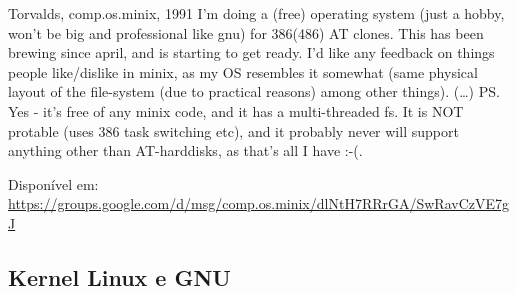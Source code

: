 \documentclass{beamer}
\begin{document}
\begin{frame}

  \begin{block}{Torvalds, comp.os.minix, 1991}
    \footnotesize{
      I'm doing a (free) operating system (just a hobby, won't be big and
      professional like gnu) for 386(486) AT clones.  This has been
      brewing since april, and is starting to get ready.  I'd like any
      feedback on things people like/dislike in minix, as my OS resembles
      it somewhat (same physical layout of the file-system (due to
      practical reasons) among other things).
      \newline
      \newline
      (\ldots)
      \newline
      \newline
      PS\@.  Yes - it's free of any minix code, and it has a
      multi-threaded fs. It is NOT protable (uses 386 task switching
      etc), and it probably never will support anything other than
      AT-harddisks, as that's all I have :-(. 
    }
	\end{block}

	\scriptsize{
	Disponível em: \url{https://groups.google.com/d/msg/comp.os.minix/dlNtH7RRrGA/SwRavCzVE7gJ}
	}

\end{frame}

\subsection{Kernel Linux e GNU}
\end{document}
